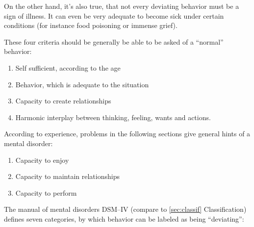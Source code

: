 \documentclass[../main.tex]{subfiles}
\begin{document}
On the other hand, it's also true, that not every deviating behavior must be a sign of illness.
It can even be very adequate to become sick under certain conditions
(for instance food poisoning or immense grief).

\noindent These four criteria should be generally be able to be asked of a ``normal'' behavior:

\begin{enumerate}
\item Self sufficient, according to the age
\item Behavior, which is adequate to the situation
\item Capacity to create relationships
  \item Harmonic interplay between thinking, feeling, wants and actions.
\end{enumerate}

\noindent According to experience, problems in the following sections give general hints of a mental disorder:

\begin{enumerate}
\item Capacity to enjoy
\item Capacity to maintain relationships
  \item Capacity to perform
\end{enumerate}

The manual of mental disorders DSM--IV (compare to \ref{sec:classif} Classification) defines seven categories,
by which behavior can be labeled as being ``deviating'':
\end{document}
